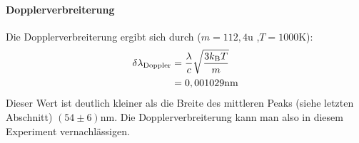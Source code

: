 \paragraph{Dopplerverbreiterung}
Die Dopplerverbreiterung ergibt sich durch ($m = 112,4\si{\atomicmassunit}$ \cite{wiki_cd},$ T = 1000\si{\kelvin}$):
\begin{align*}
\delta \lambda_\mathrm{Doppler} &= \frac{\lambda}{c}\sqrt{\frac{3k_\mathrm{B}T}{m}}\\
&= 0,001029 \si{\nano\meter}
\end{align*}
Dieser Wert ist deutlich kleiner als die Breite des mittleren Peaks (siehe letzten Abschnitt) $(54 \pm 6) \si{\nano\meter}$. Die Dopplerverbreiterung kann man also in diesem Experiment vernachlässigen.


